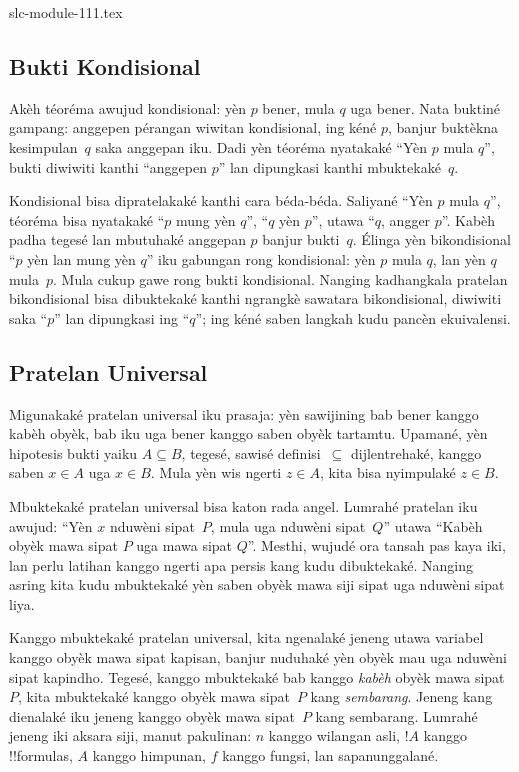 \begin{filecontents*}[overwrite]{slc-module-111.tex}
\subsection{Bukti Kondisional}

Akèh téoréma awujud kondisional: yèn $p$ bener, mula $q$ uga
bener. Nata buktiné gampang: anggepen pérangan wiwitan kondisional,
ing kéné $p$, banjur buktèkna kesimpulan~$q$ saka anggepan iku.
Dadi yèn téoréma nyatakaké ``Yèn $p$ mula $q$'', bukti diwiwiti
kanthi ``anggepen $p$'' lan dipungkasi kanthi mbuktekaké~$q$.

Kondisional bisa dipratelakaké kanthi cara béda-béda. Saliyané
``Yèn $p$ mula $q$'', téoréma bisa nyatakaké ``$p$ mung yèn
$q$'', ``$q$ yèn $p$'', utawa ``$q$, angger $p$''.
Kabèh padha tegesé lan mbutuhaké anggepan $p$ banjur bukti~$q$.
Élinga yèn bikondisional ``$p$ yèn lan mung yèn $q$''
iku gabungan rong kondisional: yèn $p$ mula $q$, lan yèn $q$
mula~$p$. Mula cukup gawe rong bukti kondisional. Nanging
kadhangkala pratelan bikondisional bisa dibuktekaké kanthi ngrangkè
sawatara bikondisional, diwiwiti saka ``$p$'' lan dipungkasi
ing ``$q$''; ing kéné saben langkah kudu pancèn ekuivalensi.

\subsection{Pratelan Universal}

Migunakaké pratelan universal iku prasaja: yèn sawijining bab
bener kanggo kabèh obyèk, bab iku uga bener kanggo saben obyèk
tartamtu. Upamané, yèn hipotesis bukti yaiku $A \subseteq B$,
tegesé, sawisé definisi~$\subseteq$ dijlentrehaké, kanggo
saben $x \in A$ uga $x \in B$. Mula yèn wis ngerti $z \in A$,
kita bisa nyimpulaké $z \in B$.

Mbuktekaké pratelan universal bisa katon rada angel. Lumrahé
pratelan iku awujud: ``Yèn $x$ nduwèni sipat~$P$, mula uga
nduwèni sipat~$Q$'' utawa ``Kabèh obyèk mawa sipat $P$ uga mawa sipat $Q$''.
Mesthi, wujudé ora tansah pas kaya iki, lan perlu latihan
kanggo ngerti apa persis kang kudu dibuktekaké. Nanging asring
kita kudu mbuktekaké yèn saben obyèk mawa siji sipat uga
nduwèni sipat liya.

Kanggo mbuktekaké pratelan universal, kita ngenalaké jeneng
utawa variabel kanggo obyèk mawa sipat kapisan, banjur
nuduhaké yèn obyèk mau uga nduwèni sipat kapindho.
Tegesé, kanggo mbuktekaké bab kanggo \emph{kabèh} obyèk mawa sipat~$P$,
kita mbuktekaké kanggo obyèk mawa sipat~$P$ kang \emph{sembarang}.
Jeneng kang dienalaké iku jeneng kanggo obyèk mawa sipat~$P$ kang sembarang.
Lumrahé jeneng iki aksara siji, manut pakulinan: $n$
kanggo wilangan asli, $!A$ kanggo !!{formula}s, $A$
kanggo himpunan, $f$ kanggo fungsi, lan sapanunggalané.


\end{filecontents*}
